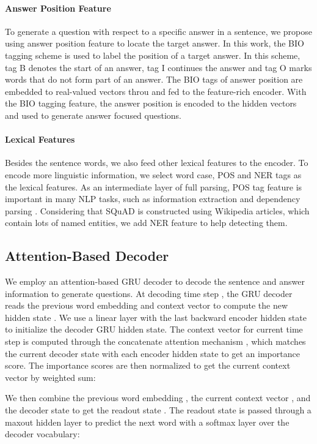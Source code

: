\documentclass[11pt,letterpaper]{article}
\begin{document}
\paragraph{Answer Position Feature}
To generate a question with respect to a specific answer in a sentence, we propose using answer position feature to locate the target answer.
In this work, the BIO tagging scheme is used to label the position of a target answer.
In this scheme, tag B denotes the start of an answer, tag I continues the answer and tag O marks words that do not form part of an answer.
The BIO tags of answer position are embedded to real-valued vectors throu and fed to the feature-rich encoder.
With the  BIO tagging feature, the answer position is encoded to the hidden vectors and used to generate answer focused questions.


\paragraph{Lexical Features}
Besides the sentence words, we also feed other lexical features to the encoder.
To encode more linguistic information, we select word case, POS and NER tags as the lexical features.
As an intermediate layer of full parsing, POS tag feature is important in many NLP tasks, such as information extraction and dependency parsing \citep{manning1999foundations}.
Considering that SQuAD is constructed using Wikipedia articles, which contain lots of named entities, we add NER feature to help detecting them.




\subsection{Attention-Based Decoder}
We employ an attention-based GRU decoder to decode the sentence and answer information to generate questions.
At decoding time step , the GRU decoder reads the previous word embedding  and context vector   to compute the new hidden state .
We use a linear layer with the last backward encoder hidden state  to initialize the decoder GRU hidden state.
The context vector  for current time step  is computed through the concatenate attention mechanism \citep{luong-pham-manning:2015:EMNLP}, which matches the current decoder state  with each encoder hidden state  to get an importance score. The importance scores are then normalized to get the current context vector by weighted sum:


We then combine the previous word embedding , the current context vector , and the decoder state  to get the readout state .
The readout state is passed through a maxout hidden layer \citep{goodfellow2013maxout} to predict the next word with a softmax layer over the decoder vocabulary:
\end{document}
